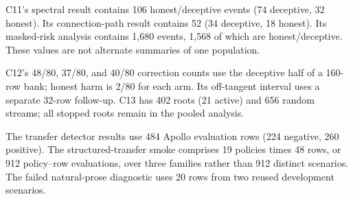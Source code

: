 C11's spectral result contains 106 honest/deceptive events (74 deceptive, 32 honest). Its
connection-path result contains 52 (34 deceptive, 18 honest). Its masked-risk analysis contains
1,680 events, 1,568 of which are honest/deceptive. These values are not alternate summaries of one
population.

C12's 48/80, 37/80, and 40/80 correction counts use the deceptive half of a 160-row bank; honest
harm is 2/80 for each arm. Its off-tangent interval uses a separate 32-row follow-up. C13 has 402
roots (21 active) and 656 random streams; all stopped roots remain in the pooled analysis.

The transfer detector results use 484 Apollo evaluation rows (224 negative, 260 positive). The
structured-transfer smoke comprises 19 policies times 48 rows, or 912 policy--row evaluations,
over three families rather than 912 distinct scenarios. The failed natural-prose diagnostic uses
20 rows from two reused development scenarios.
